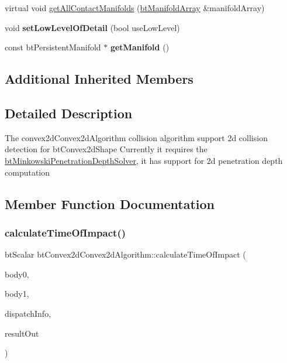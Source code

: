 \begin{DoxyCompactItemize}
\item 
virtual void \hyperlink{classbtConvex2dConvex2dAlgorithm_ade3af2f3f04d9b202535d33550a94be4}{get\+All\+Contact\+Manifolds} (\hyperlink{classbtAlignedObjectArray}{bt\+Manifold\+Array} \&manifold\+Array)
\item 
\mbox{\label{classbtConvex2dConvex2dAlgorithm_a287f00ab22f2a15215effc4f1f14f8a9}} 
void {\bfseries set\+Low\+Level\+Of\+Detail} (bool use\+Low\+Level)
\item 
\mbox{\label{classbtConvex2dConvex2dAlgorithm_a3db358838172c32e1fd075461ace5a58}} 
const bt\+Persistent\+Manifold $\ast$ {\bfseries get\+Manifold} ()
\end{DoxyCompactItemize}
\subsection*{Additional Inherited Members}


\subsection{Detailed Description}
The convex2d\+Convex2d\+Algorithm collision algorithm support 2d collision detection for bt\+Convex2d\+Shape Currently it requires the \hyperlink{classbtMinkowskiPenetrationDepthSolver}{bt\+Minkowski\+Penetration\+Depth\+Solver}, it has support for 2d penetration depth computation 

\subsection{Member Function Documentation}
\mbox{\label{classbtConvex2dConvex2dAlgorithm_a32bf85e0246ed54dd41edd861294c37e}} 
\subsubsection{\texorpdfstring{calculate\+Time\+Of\+Impact()}{calculateTimeOfImpact()}}
{\footnotesize\ttfamily bt\+Scalar bt\+Convex2d\+Convex2d\+Algorithm\+::calculate\+Time\+Of\+Impact (\begin{DoxyParamCaption}\item[{bt\+Collision\+Object $\ast$}]{body0,  }\item[{bt\+Collision\+Object $\ast$}]{body1,  }\item[{const \hyperlink{structbtDispatcherInfo}{bt\+Dispatcher\+Info} \&}]{dispatch\+Info,  }\item[{\hyperlink{classbtManifoldResult}{bt\+Manifold\+Result} $\ast$}]{result\+Out }\end{DoxyParamCaption})\hspace{0.3cm}{\ttfamily [virtual]}}


